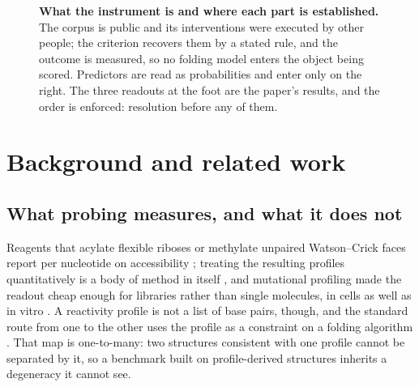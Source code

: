 \documentclass[11pt]{article}
\begin{document}

\begin{figure}[t]
\centering

\caption{\textbf{What the instrument is and where each part is established.} The corpus is public
and its interventions were executed by other people; the criterion recovers them by a stated rule,
and the outcome is measured, so no folding model enters the object being scored. Predictors are
read as probabilities and enter only on the right. The three readouts at the foot are the paper's
results, and the order is enforced: resolution before any of them.}
\label{fig:arch}
\end{figure}

\section{Background and related work}
\label{sec:background}

\subsection{What probing measures, and what it does not}
\label{sec:probing}
Reagents that acylate flexible riboses or methylate unpaired Watson--Crick faces report per
nucleotide on accessibility \citep{ehresmann1987probing,merino2005rna,wilkinson2006selective,
weeks2010advances,siegfried2014rna}; treating the resulting profiles quantitatively is a body of
method in itself \citep{cordero2012quantitative,smola2015selective}, and mutational profiling made
the readout cheap enough for libraries rather than single molecules, in cells as well as in vitro
\citep{rouskin2014genome,spitale2015structural,zubradt2017dms,marinus2021novel}. A reactivity
profile is not a list of base pairs, though, and the standard route from one to the other uses the
profile as a constraint on a folding algorithm \citep{deigan2009accurate,hajdin2013accurate}. That
map is one-to-many: two structures consistent with one profile cannot be separated by it, so a
benchmark built on profile-derived structures inherits a degeneracy it cannot see.
\end{document}
